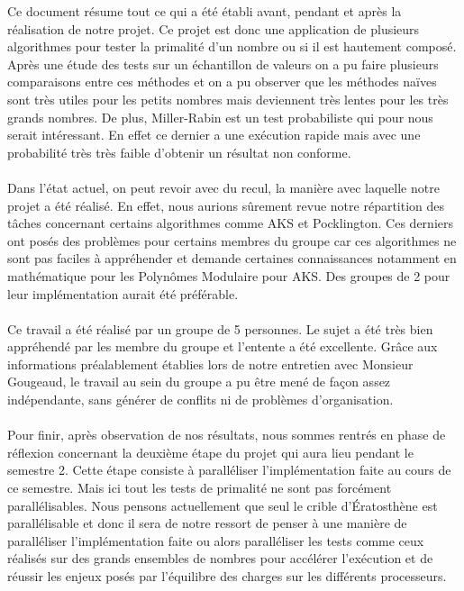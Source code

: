 	Ce document résume tout ce qui a été établi avant, pendant et après la réalisation de notre projet. Ce projet est donc une application de plusieurs algorithmes pour tester la primalité d'un nombre ou si il est hautement composé. Après une étude des tests sur un échantillon de valeurs on a pu faire plusieurs comparaisons entre ces méthodes et on a pu observer que les méthodes naïves sont très utiles pour les petits nombres mais deviennent très lentes pour les très grands nombres. De plus, Miller-Rabin est un test probabiliste qui pour nous serait intéressant. En effet ce dernier a une exécution rapide mais avec une probabilité très très faible d'obtenir un résultat non conforme.
		\paragraph{} Dans l'état actuel, on peut revoir avec du recul, la manière avec laquelle notre projet a été réalisé. En effet, nous aurions sûrement revue notre répartition des tâches concernant certains algorithmes comme AKS et Pocklington. Ces derniers ont posés des problèmes pour certains membres du groupe car ces algorithmes ne sont pas faciles à appréhender et demande certaines connaissances notamment en mathématique pour les Polynômes Modulaire pour AKS. Des groupes de 2 pour leur implémentation aurait été préférable.
		\paragraph{} Ce travail a été réalisé par un groupe de 5 personnes. Le sujet a été très bien appréhendé par les membre du groupe et l'entente a été excellente. Grâce aux informations préalablement établies lors de notre entretien avec Monsieur Gougeaud, le travail au sein du groupe a pu être mené de façon assez indépendante, sans générer de conflits ni de problèmes d'organisation.		
		\paragraph{} Pour finir, après observation de nos résultats, nous sommes rentrés en phase de réflexion concernant la deuxième étape du projet qui aura lieu pendant le semestre 2. Cette étape consiste à paralléliser l'implémentation faite au cours de ce semestre. Mais ici tout les tests de primalité ne sont pas forcément parallélisables. Nous pensons actuellement que seul le crible d’Ératosthène est parallélisable et donc il sera de notre ressort de penser à une manière de paralléliser l'implémentation faite ou alors paralléliser les tests comme ceux réalisés sur des grands ensembles de nombres pour accélérer l'exécution et de réussir les enjeux posés par l'équilibre des charges sur les différents processeurs.




